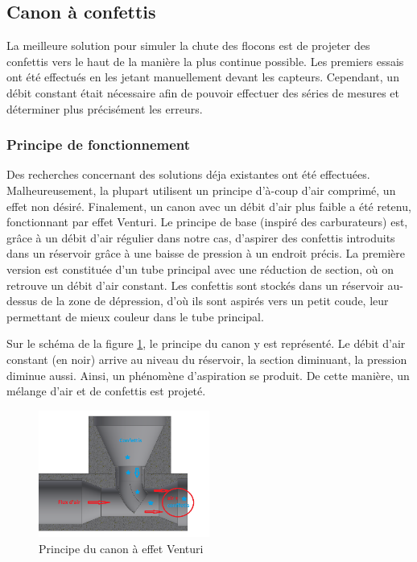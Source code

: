\subsection{Canon à confettis}

La meilleure solution pour simuler la chute des flocons est de projeter des confettis vers le haut 
de la manière la plus continue possible. Les premiers essais ont été effectués en les jetant manuellement 
devant les capteurs. Cependant, un débit constant était nécessaire afin de pouvoir effectuer des séries de
mesures et déterminer plus précisément les erreurs. 

\subsubsection{Principe de fonctionnement}

Des recherches concernant des solutions déja existantes ont été effectuées. Malheureusement, la plupart 
utilisent un principe d'à-coup d'air comprimé, un effet non désiré. Finalement, un canon avec un 
débit d'air plus faible a été retenu, fonctionnant par effet Venturi.
Le principe de base (inspiré des carburateurs) est, grâce à un débit d’air régulier dans 
notre cas, d’aspirer des confettis introduits dans un réservoir grâce à une baisse de pression à un 
endroit précis. La première version est constituée d’un tube principal avec une réduction de section, où
on retrouve un débit d'air constant. Les confettis sont stockés dans un réservoir au-dessus de la zone 
de dépression, d'où ils sont aspirés vers un petit coude, leur permettant de mieux couleur dans le 
tube principal.\par 
Sur le schéma de la figure \ref{fig:venturi}, le principe du canon y est représenté. Le débit d’air constant 
(en noir) arrive au niveau du réservoir, la section diminuant, la pression diminue aussi. Ainsi, un phénomène 
d’aspiration se produit. De cette manière, un mélange d'air et de confettis est projeté.

\begin{figure}[H]
    \centering
    \includegraphics[width=0.5\textwidth]{Images/photos_PGA/venturi_v1b.PNG}
    \caption{Principe du canon à effet Venturi}
    \label{fig:venturi}
\end{figure}

